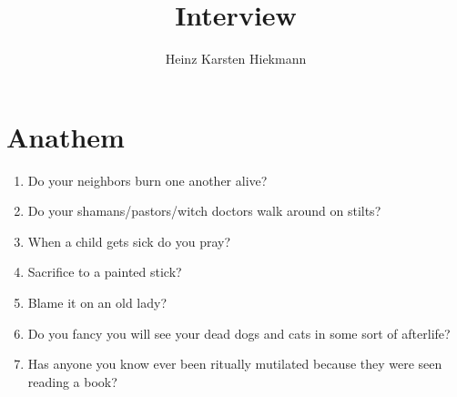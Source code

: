 \documentclass[10pt,a4paper]{article}
\author{Heinz Karsten Hiekmann}
\title{Interview}
\begin{document}
	\maketitle
	\clearpage
\section{Anathem}
	\begin{enumerate}
		\item Do your neighbors burn one another alive?
		\item Do your shamans/pastors/witch doctors walk around on stilts?
		\item When a child gets sick do you pray?
		\item Sacrifice to a painted stick?
		\item Blame it on an old lady?
		\item Do you fancy you will see your dead dogs and cats in some sort of afterlife?
		\item Has anyone you know ever been ritually mutilated because they were seen reading a book?
	\end{enumerate}
\end{document}
